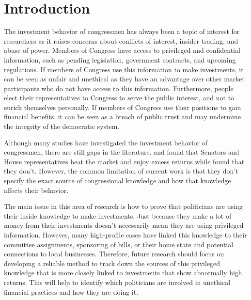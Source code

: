 \documentclass[15pt,letterpaper]{article}
\newcommand\spacingset[1]{\renewcommand{\baselinestretch}
{#1}\small\normalsize}
\begin{document}
\section{Introduction}
\spacingset{2} %
The investment behavior of congressmen has always been a topic of interest for researchers as it raises concerns about conflicts of interest, insider trading, and abuse of power. Members of Congress have access to privileged and confidential information, such as pending legislation, government contracts, and upcoming regulations. 
If members of Congress use this information to make investments, it can be seen as unfair and unethical as they have an advantage over other market participants who do not have access to this information. Furthermore, people elect their representatives to Congress to serve the public interest, and not to enrich themselves personally. 
If members of Congress use their positions to gain financial benefits, it can be seen as a breach of public trust and may undermine the integrity of the democratic system.

Although many studies have investigated the investment behavior of congressmen, there are still gaps in the literature. \cite{zi11} and \cite{zi24} found that Senators and House representatives beat the market and enjoy excess returns while \cite{eg13} found that they don't. 
However, the common limitation of current work is that they don't specify the exact source of congressional knowledge and how that knowledge affects their behavior.

The main issue in this area of research is how to prove that politicians are using their inside knowledge to make investments. Just because they make a lot of money from their investments doesn't necessarily mean they are using privileged information. However, many high-profile cases have linked this knowledge to their committee assignments, sponsoring of bills, or their home state and potential connections to local businesses. Therefore, future research should focus on developing a reliable method to track down the sources of this privileged knowledge that is more closely linked to investments that show abnormally high returns. This will help to identify which politicians are involved in unethical financial practices and how they are doing it.
\end{document}
